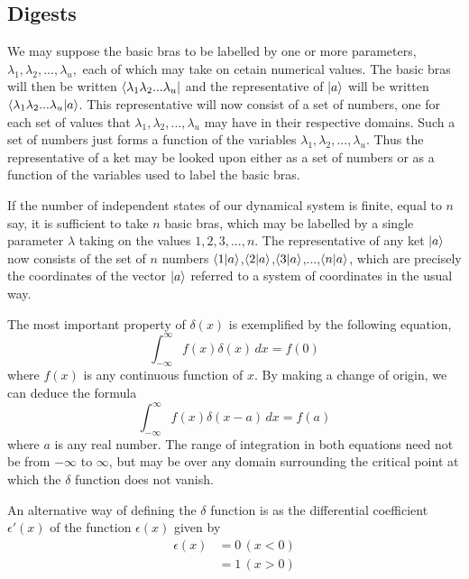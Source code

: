 \subsection{Digests}
We may suppose the basic bras to be labelled by one or more parameters, $\lambda_1,\lambda_2,...,\lambda_u,$ each of which may take on cetain numerical values. The basic bras will then be written $\langle \lambda_1\lambda_2...\lambda_u |$ and the representative of $| a \rangle$ will be written $\langle \lambda_1\lambda_2...\lambda_u | a \rangle$. This representative will now consist of a set of numbers, one for each set of values that $\lambda_1,\lambda_2,...,\lambda_u$ may have in their respective domains. Such a set of numbers just forms a function of the variables $\lambda_1,\lambda_2,...,\lambda_u$. Thus the representative of a ket may be looked upon either as a set of numbers or as a function of the variables used to label the basic bras.

If the number of independent states of our dynamical system is finite, equal to $n$ say, it is sufficient to take $n$ basic bras, which may be labelled by a single parameter $\lambda$ taking on the values $1,2,3,...,n$. The representative of any ket $| a \rangle$ now consists of the set of $n$ numbers $\langle 1 | a \rangle$,$\langle 2 | a \rangle$,$\langle 3 | a \rangle$,...,$\langle n | a \rangle$, which are precisely the coordinates of the vector $| a \rangle$ referred to a system of coordinates in the usual way.

The most important property of $\delta(x)$ is exemplified by the following equation,
\begin{equation}
\int_{-\infty}^{\infty} f(x) \delta(x) \, dx = f(0)
\end{equation}
where $f(x)$ is any continuous function of $x$. By making a change of origin, we can deduce the formula
\begin{equation}
\int_{-\infty}^{\infty} f(x) \delta(x-a) \, dx = f(a)
\end{equation}
where $a$ is any real number. The range of integration in both equations need not be from $-\infty$ to $\infty$, but may be over any domain surrounding the critical point at which the $\delta$ function does not vanish.


An alternative way of defining the $\delta$ function is as the differential coefficient $\epsilon'(x)$ of the function $\epsilon(x)$ given by
\begin{align*}
\epsilon(x) & = 0 \,(x < 0)\\
& = 1 \, (x>0)
\end{align*}

